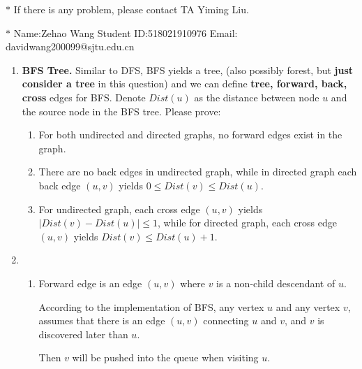 \documentclass[12pt,a4paper]{article}
\makeatletter
\newtheorem*{solution}{Solution}
\theoremstyle{definition}
\renewenvironment{solution}[1][Solution] {\par\pushQED{\qed}\normalfont\topsep6\p@\@plus6\p@\relax\trivlist\item[\hskip\labelsep\bfseries#1\@addpunct{.}]\ignorespaces}{\popQED\endtrivlist\@endpefalse} \makeatother
\makeatother
\begin{document}
\noindent

\noindent{}
\begin{center}
\footnotesize{\color{red}$*$ If there is any problem, please contact TA Yiming Liu.}

\footnotesize{\color{blue}$*$ Name:Zehao Wang  \quad Student ID:518021910976 \quad Email: davidwang200099@sjtu.edu.cn}
\end{center}

\begin{enumerate}
    \item
    \textbf{BFS Tree.} Similar to DFS, BFS yields a tree, (also possibly forest, but \textbf{just consider a tree} in this question) and we can define \textbf{tree, forward, back, cross} edges for BFS. Denote $Dist(u)$ as the distance between node $u$ and the source node in the BFS tree. Please prove:
    \begin{enumerate}
    	\item For both undirected and directed graphs, no forward edges exist in the graph.
    	
    	\item There are no back edges in undirected graph, while in directed graph each back edge $(u,v)$ yields $0\leq Dist(v)\leq Dist(u)$.
    	
    	\item For undirected graph, each cross edge $(u,v)$ yields $|Dist(v)-Dist(u)|\le 1$, while for directed graph, each cross edge $(u,v)$ yields $Dist(v)\leq Dist(u)+1$.
    	
    \end{enumerate}
\begin{solution}
	\begin{enumerate}
		\item
			Forward edge is an edge $(u,v)$ where $v$ is a non-child descendant of $u$.
		
		    According to the implementation of BFS, any vertex $u$ and any vertex $v$, assumes that there is an edge $(u,v)$ connecting $u$ and $v$, and $v$ is discovered later than $u$.
		    
		    Then $v$ will be pushed into the queue when visiting $u$. 
		    

\end{enumerate}
\end{solution}
\end{enumerate}
\end{document}
